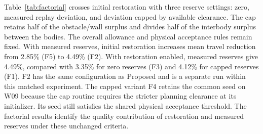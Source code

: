 Table~\ref{tab:factorial} crosses initial restoration with three reserve settings: zero, measured replay deviation, and deviation capped by available clearance. The cap retains half of the obstacle/wall surplus and divides half of the interbody surplus between the bodies. The overall allowance and physical acceptance rules remain fixed. With measured reserves, initial restoration increases mean travel reduction from 2.85\% (F5) to 4.49\% (F2). With restoration enabled, measured reserves give 4.49\%, compared with 3.35\% for zero reserves (F3) and 4.12\% for capped reserves (F1). F2 has the same configuration as Proposed and is a separate run within this matched experiment.
The capped variant F4 retains the common seed on W09 because the cap routine requires the stricter planning clearance at its initializer. Its seed still satisfies the shared physical acceptance threshold. The factorial results identify the quality contribution of restoration and measured reserves under these unchanged criteria.
